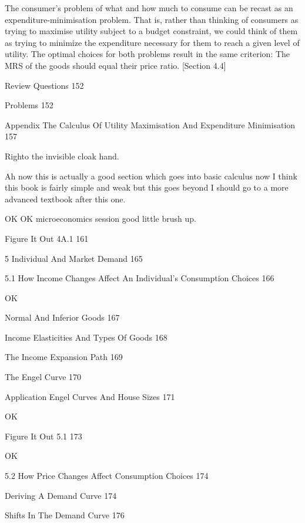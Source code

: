 The consumer's problem of what and how much to consume can be recast as an expenditure-minimisation problem. That is, rather than thinking of consumers as trying to maximise utility subject to a budget constraint, we could think of them as trying to minimize the expenditure necessary for them to reach a given level of utility. The optimal choices for both problems result in the same criterion: The MRS of the goods should equal their price ratio. [Section 4.4]



Review Questions 152



Problems 152



Appendix The Calculus Of Utility Maximisation And Expenditure Minimisation 157

Righto the invisible cloak hand.

Ah now this is actually a good section which goes into basic calculus now I think this book is fairly simple and weak but this goes beyond I should go to a more advanced textbook after this one.

OK OK microeconomics session good little brush up.

Figure It Out 4A.1 161



5 Individual And Market Demand 165



5.1 How Income Changes Affect An Individual's Consumption Choices 166

OK

Normal And Inferior Goods 167



Income Elasticities And Types Of Goods 168



The Income Expansion Path 169



The Engel Curve 170



Application Engel Curves And House Sizes 171

OK

Figure It Out 5.1 173

OK

5.2 How Price Changes Affect Consumption Choices 174



Deriving A Demand Curve 174



Shifts In The Demand Curve 176

